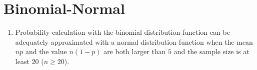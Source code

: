\section{Binomial-Normal}

\begin{enumerate}
    \item Probability calculation with the binomial distribution function can be adequately approximated with a normal distribution function when the mean $np$ and the value $n (1 - p)$ are both larger than $5$ and the sample size is at least $20$ ($n \geq 20$).
    \hfill \cite{statistics/book/Statistics-for-Data-Scientists/Maurits-Kaptein}
\end{enumerate}






